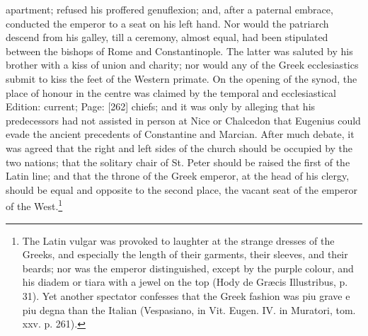 apartment; refused his proffered genuflexion; and, after a paternal embrace, conducted the emperor to a seat on his left hand. Nor would the patriarch descend from his galley, till a ceremony, almost equal, had been stipulated between the bishops of Rome and Constantinople. The latter was saluted by his brother with a kiss of union and charity; nor would any of the Greek ecclesiastics submit to kiss the feet of the Western primate. On the opening of the synod, the place of honour in the centre was claimed by the temporal and ecclesiastical Edition: current; Page: [262] chiefs; and it was only by alleging that his predecessors had not assisted in person at Nice or Chalcedon that Eugenius could evade the ancient precedents of Constantine and Marcian. After much debate, it was agreed that the right and left sides of the church should be occupied by the two nations; that the solitary chair of St. Peter should be raised the first of the Latin line; and that the throne of the Greek emperor, at the head of his clergy, should be equal and opposite to the second place, the vacant seat of the emperor of the West.\footnote{The Latin vulgar was provoked to laughter at the strange dresses of the Greeks, and especially the length of their garments, their sleeves, and their beards; nor was the emperor distinguished, except by the purple colour, and his diadem or tiara with a jewel on the top (Hody de Græcis Illustribus, p. 31). Yet another spectator confesses that the Greek fashion was piu grave e piu degna than the Italian (Vespasiano, in Vit. Eugen. IV. in Muratori, tom. xxv. p. 261).}

